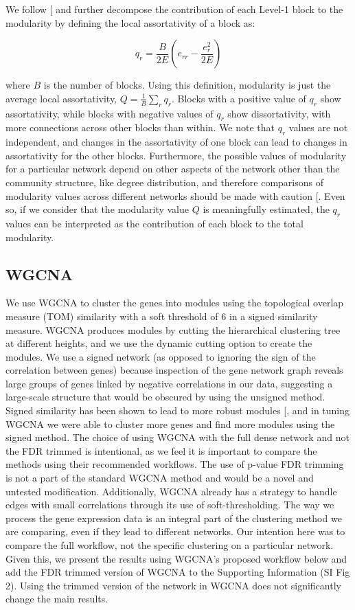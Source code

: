 \documentclass[
]{article}
\begin{document}
We follow {[}\citeproc{ref-Peixoto2018-or}{14}{]} and further decompose
the contribution of each Level-1 block to the modularity by defining the
local assortativity of a block as:

\[
q_r = \frac{B}{2E} \left ( e_{rr} - \frac{e_{r}^2}{2E} \right )
\]

where \(B\) is the number of blocks. Using this definition, modularity
is just the average local assortativity,
\(Q = \frac{1}{B} \sum_r  q_r\). Blocks with a positive value of \(q_r\)
show assortativity, while blocks with negative values of \(q_r\) show
dissortativity, with more connections across other blocks than within.
We note that \(q_r\) values are not independent, and changes in the
assortativity of one block can lead to changes in assortativity for the
other blocks. Furthermore, the possible values of modularity for a
particular network depend on other aspects of the network other than the
community structure, like degree distribution, and therefore comparisons
of modularity values across different networks should be made with
caution {[}\citeproc{ref-Cinelli2020-tx}{28}{]}. Even so, if we consider
that the modularity value \(Q\) is meaningfully estimated, the \(q_r\)
values can be interpreted as the contribution of each block to the total
modularity.

\subsection{WGCNA}\label{wgcna}

We use WGCNA to cluster the genes into modules using the topological
overlap measure (TOM) similarity with a soft threshold of 6 in a signed
similarity measure. WGCNA produces modules by cutting the hierarchical
clustering tree at different heights, and we use the dynamic cutting
option to create the modules. We use a signed network (as opposed to
ignoring the sign of the correlation between genes) because inspection
of the gene network graph reveals large groups of genes linked by
negative correlations in our data, suggesting a large-scale structure
that would be obscured by using the unsigned method. Signed similarity
has been shown to lead to more robust modules
{[}\citeproc{ref-Mason2009-ej}{29}{]}, and in tuning WGCNA we were able
to cluster more genes and find more modules using the signed method. The
choice of using WGCNA with the full dense network and not the FDR
trimmed is intentional, as we feel it is important to compare the
methods using their recommended workflows. The use of p-value FDR
trimming is not a part of the standard WGCNA method and would be a novel
and untested modification. Additionally, WGCNA already has a strategy to
handle edges with small correlations through its use of
soft-thresholding. The way we process the gene expression data is an
integral part of the clustering method we are comparing, even if they
lead to different networks. Our intention here was to compare the full
workflow, not the specific clustering on a particular network. Given
this, we present the results using WGCNA's proposed workflow below and
add the FDR trimmed version of WGCNA to the Supporting Information (SI
Fig 2). Using the trimmed version of the network in WGCNA does not
significantly change the main results.
\end{document}
